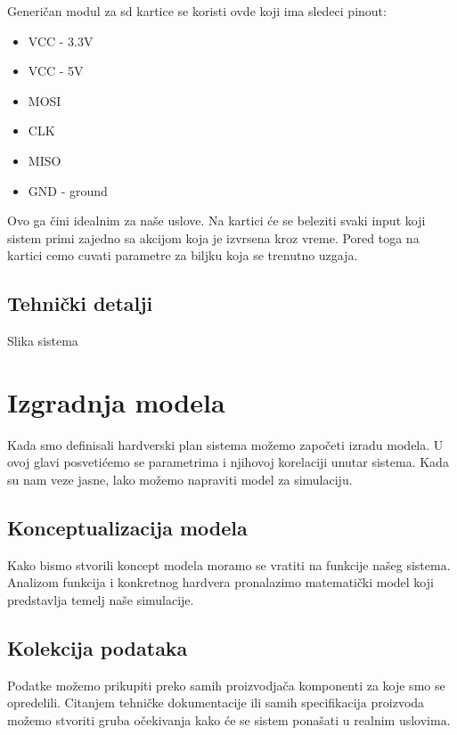 \documentclass[a4paper,11pt]{book}
\begin{document}
Generičan modul za sd kartice se koristi ovde koji ima sledeci pinout:

\hrulefill
\begin{itemize}
  \item VCC - 3.3V
  \item VCC - 5V
  \item MOSI
  \item CLK 
  \item MISO
  \item GND - ground
\end{itemize}
\hrulefill

Ovo ga čini idealnim za naše uslove. Na kartici će se beleziti svaki input koji sistem primi zajedno sa akcijom koja je izvrsena kroz vreme. Pored toga na kartici cemo cuvati parametre za biljku koja se trenutno uzgaja.

\section{Tehnički detalji}

Slika sistema

\chapter{Izgradnja modela}

Kada smo definisali hardverski plan sistema možemo započeti izradu modela. U ovoj glavi posvetićemo se parametrima i njihovoj korelaciji unutar sistema. Kada su nam veze jasne, lako možemo napraviti model za simulaciju.

\section{Konceptualizacija modela}

Kako bismo stvorili koncept modela moramo se vratiti na funkcije našeg sistema. Analizom funkcija i konkretnog hardvera pronalazimo matematički model koji predstavlja temelj naše simulacije.\\


\section{Kolekcija podataka}

Podatke možemo prikupiti preko samih proizvodjača komponenti za koje smo se opredelili. Citanjem tehničke dokumentacije ili samih specifikacija proizvoda možemo stvoriti gruba očekivanja kako će se sistem ponašati u realnim uslovima. \\
\end{document}
